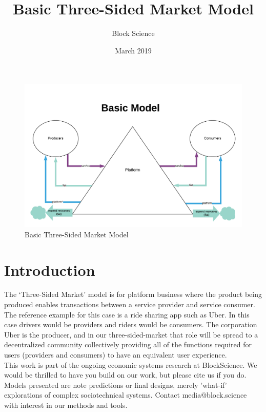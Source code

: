 \documentclass[12pt]{extarticle}
\title{Basic Three-Sided Market Model}
\author{Block Science}
\date{March 2019}
\begin{document}
\maketitle

\begin{figure}
    \centering
    \includegraphics[width=1\textwidth]{images/3SidedMarketBasicDemo.png}
    \caption{Basic Three-Sided Market Model}
\end{figure}

\section{Introduction}
The ‘Three-Sided Market’ model is for platform business where the product being produced enables transactions between a service provider and service consumer. The reference example for this case is a ride sharing app such as Uber. In this case drivers would be providers and riders would be consumers. The corporation Uber is the producer, and in our three-sided-market that role will be spread to a decentralized community collectively providing all of the functions required for users (providers and consumers) to have an equivalent user experience. \\

This work is part of the ongoing economic systems research at BlockScience. We would be thrilled to have you build on our work, but please cite us if you do. \\

Models presented are note predictions or final designs, merely 'what-if' explorations of complex sociotechnical systems. Contact media@block.science with interest in our methods and tools.
\end{document}
